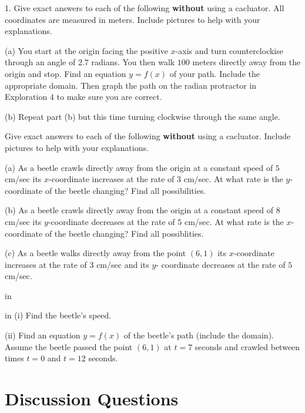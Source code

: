 \documentclass{ximera}
\newcommand{\pskip}{\vskip 0.1 in}
\begin{document}
\begin{question}  \label{Qsdg53:Cosine}
1. Give exact answers to each of the following {\bf without} using a cacluator. All coordinates are measured in meters. Include pictures to help with your explanations.

(a) You start at the origin facing the positive $x$-axis and turn counterclockise through an angle of $2.7$ radians. You then walk $100$ meters directly away from the origin and stop. Find an equation $y=f(x)$ of your path. Include the appropriate domain. Then graph the path on the radian protractor in Exploration 4 to make sure you are correct.

(b) Repeat part (b) but this time turning clockwise through the same angle. 


\end{question}





\begin{question} \label{Qet433:Cosine}
Give exact answers to each of the following {\bf without} using a cacluator. Include pictures to help with your explanations.

(a) As a beetle crawls directly away from the origin at a constant speed of $5$ cm/sec its $x$-coordinate increases at the rate of $3$ cm/sec. At what rate is the $y$-coordinate of the beetle changing? Find all possibilities. 

(b) As a beetle crawls directly away from the origin at a constant speed of $8$ cm/sec its $y$-coordinate decreases at the rate of $5$ cm/sec. At what rate is the $x$-coordinate of the beetle changing? Find all possiblities. 

(c) As a beetle walks directly away from the point $(6,1)$ its $x$-coordinate increases at the rate of $3$ cm/sec and its $y$-
coordinate decreases at the rate of $5$ cm/sec. 

\pskip

 in (i) Find the beetle's speed. 

(ii) Find an equation $y=f(x)$ of the beetle's path (include the domain). Assume the beetle passed the point $(6,1)$ at $t=7$ seconds and crawled between times $t=0$ and $t=12$ seconds. 

\end{question}


\section{Discussion Questions}
\end{document}
